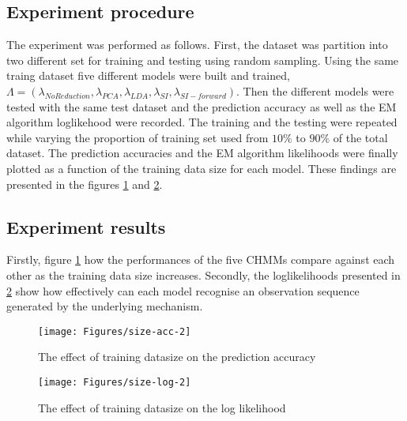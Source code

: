 \subsection{Experiment procedure}
The experiment was performed as follows.
First, the dataset was partition into two different set for training and testing using random sampling.
Using the same traing dataset five different models were built and trained, \(\Lambda = (\lambda_{No Reduction}, \lambda_{PCA}, \lambda_{LDA}, \lambda_{SI}, \lambda_{SI-forward})\).
Then the different models were tested with the same test dataset and the prediction accuracy as well as the EM algorithm loglikehood were recorded.
The training and the testing were repeated while varying the proportion of training set used from \(10\%\) to \(90\%\) of the total dataset.
The prediction accuracies and the EM algorithm likelihoods were finally plotted as a function of the training data size for each model.
These findings are presented in the figures \ref{fig:size-acc} and \ref{fig:size-log}. 

\subsection{Experiment results}
Firstly, figure \ref{fig:size-acc} how the performances of the five CHMMs compare against each other as the training data size increases.
Secondly, the loglikelihoods presented in \ref{fig:size-log} show how effectively can each model recognise an observation sequence generated by the underlying mechanism.

\begin{figure}[ht!]
	\texttt{[image: Figures/size-acc-2]}
	\caption{The effect of training datasize on the prediction accuracy}
	\label{fig:size-acc}
\end{figure}

\begin{figure}[ht!]
	\texttt{[image: Figures/size-log-2]}
	\caption{The effect of training datasize on the log likelihood}
	\label{fig:size-log}
\end{figure}


\begin{figure}[ht!]
\end{figure}


\begin{figure}[ht!]
\end{figure}
\begin{figure}[ht!]
\end{figure}

